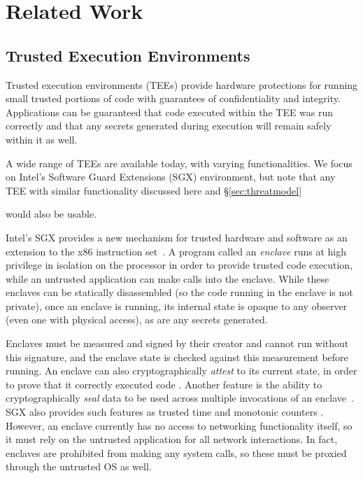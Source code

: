 \section{Related Work}
\label{sec:related}


\subsection{Trusted Execution Environments}

Trusted execution environments (TEEs) provide hardware protections for running
small trusted portions of code with guarantees of confidentiality and
integrity.  Applications can be guaranteed that code executed within the
TEE was run correctly and that any secrets generated during execution
will remain safely within it as well.

A wide range of TEEs are available today, with varying functionalities.
We focus on Intel's Software Guard Extensions (SGX) environment,
but note that any TEE with similar functionality discussed here and
\S\ref{sec:threatmodel}

would also be usable.

%
Intel's SGX provides a new mechanism for trusted
hardware and software as an extension to the x86 instruction set~\cite{sgx,
mckeen2013innovative}.  
%
A program called an \textit{enclave} runs at high
privilege in isolation on the processor in order to provide trusted code
execution, while an untrusted application can make calls into the enclave.
%
While these enclaves can be statically disassembled (so the code running in the
enclave is not private), once an enclave is running, its internal state is
opaque to any observer (even one with physical access), as are any secrets generated.  


Enclaves must be measured and signed by their creator and cannot run without
this signature, and the enclave state is checked against this measurement
before running.  
%
An enclave can also cryptographically \textit{attest} to its current state, in
order to prove that it correctly executed code \cite{sgx_provisioning,
anati2013innovative}.  
%
Another feature is the ability to cryptographically \textit{seal} data to be
used across multiple invocations of an enclave~\cite{anati2013innovative,
sgx_sealing}.  
%
SGX also provides such features as trusted time and monotonic counters
\cite{sgx-linux-sdk,sgx-trusted-time}.  
%
However, an enclave currently has no access to networking functionality itself,
so it must rely on the untrusted application for all network interactions.  
%
In fact, enclaves are prohibited from making any system calls, so these must be
proxied through the untrusted OS as well.

